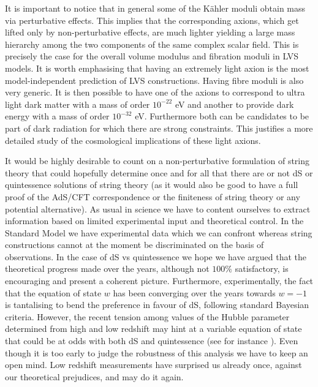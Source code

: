 \documentclass[11pt,a4paper]{article}
\begin{document}
\begin{itemize}
It is important to notice that in general some of the K\"ahler moduli obtain mass via perturbative effects. This implies that the corresponding axions, which get lifted only by non-perturbative effects, are much lighter yielding a large mass hierarchy among the two components of the same complex scalar field. This is precisely the case for the overall volume modulus and  fibration moduli in LVS models. It is worth emphasising that having an extremely light axion is the most model-independent prediction of LVS constructions. Having fibre moduli is also very generic. It is then possible to have one of the axions to correspond to ultra light dark matter with a mass of order $10^{-22}$ eV and another to provide dark energy with a mass of order $10^{-32}$ eV. Furthermore both can be candidates to be part of dark radiation for which there are strong constraints. This justifies a more detailed study of the cosmological implications of these light axions.

It would be highly desirable to count on a non-perturbative formulation of string theory that could hopefully determine once and for all that there are or not dS or quintessence solutions of string theory (as it would also be good to have a full proof of the AdS/CFT correspondence or the finiteness of string theory or any potential alternative). As usual in science we have to content ourselves to extract information based on limited experimental input  and theoretical control. In the Standard Model we have experimental data which we can confront whereas string constructions cannot at the moment be discriminated on the basis of observations. In the case of dS vs quintessence we hope we have argued that the theoretical progress made over the years, although not $100\%$ satisfactory, is encouraging and present a coherent picture. Furthermore, experimentally, the fact that the equation of state $w$ has been converging over the years towards $w=-1$ is tantalising to bend the preference in favour of dS, following standard Bayesian criteria. However, the recent tension among values of the Hubble parameter determined from high and low redshift may hint at a variable equation of state that could be at odds with both dS and quintessence (see for instance \cite{Wang:2018fng, Capozziello:2018jya, Dutta:2018vmq}). Even though it is too early to judge the robustness of this analysis we have to keep an open mind. Low redshift measurements have surprised us already once, against our theoretical prejudices, and may do it again. 
 

\end{itemize}
\end{document}
